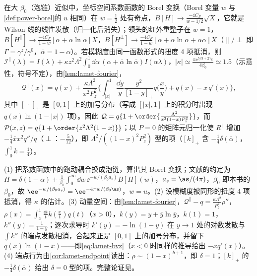 \begin{proposition}\label{prop:lamet-bvz}
在大 $\beta_0$（泡链）近似中，坐标空间系数函数的 Borel 变换（Borel 变量 $w$ 与\cref{def:power-borel}的 $u$ 相同）在 $w=\frac12$ 处有奇点，$B[H]\to\frac{-4C_F}{w-1/2}\sqrt X$，它就是 Wilson 线的线性发散（归一化后消失）；领头的红外重整子在 $w=1$，$B[H^\parallel]\to\frac{-4C_F}{1-w}[\alpha+\bar\alpha\ln\bar\alpha]X$，$B[H^\perp]\to\frac{-4C_F}{1-w}[\alpha+\bar\alpha\ln\bar\alpha+\alpha\bar\alpha]X$（$\parallel/\perp$ 即 $\Gamma=\gamma^z/\gamma^0$，$\bar\alpha=1-\alpha$）。若模糊度由同一函数形式的扭度 4 项抵消，则 $\mathcal I^\parallel(\lambda)=I(\lambda)+\kappa z^2\Lambda^2\int_0^1\dd\alpha\,(\alpha+\bar\alpha\ln\bar\alpha)I(\alpha\lambda)$，$|\kappa|\simeq\frac{\pi\ee^{5/3+2\gamma_E}}{4\beta_0}\simeq1.5$（示意性，符号不定），由\cref{lem:lamet-fourier}，
\begin{equation}\label{eq:lamet-bvz}
\mathcal Q^\parallel(x)=q(x)+\frac{\kappa\Lambda^2}{x^2P_z^2}\Big\{\int_{|x|}^1\frac{\dd y}y\frac{y^2}{[1-y]_+}q\Big(\frac xy\Big)+q(x)-x\,q'(x)\Big\},
\end{equation}%
其中 $[\,\cdot\,]_+$ 是 $[0,1]$ 上的加号分布（写成 $[|x|,1]$ 上的积分时出现 $q(x)\ln(1-|x|)$ 项）。因此 $\mathcal Q=q\{1+\order{\frac{\Lambda^2}{x^2(1-x)P_z^2}}\}$，而 $\mathcal P(x,z)=q\{1+\order{z^2\Lambda^2(1-x)}\}$；以 $P=0$ 的矩阵元归一化使 $R^\parallel$ 增加 $-\frac14\bar xx^2q''/q$（$\perp$：$-\frac5{12}$），即 $\Lambda^2/((1-x)^2P_z^2)$ 型的项（$[k]_+$ 含 $-\frac14\delta(\bar\alpha)$，$\int_0^1k=\frac14$）。
\end{proposition}

\begin{proofsketch}
(1) 把系数函数中的跑动耦合换成泡链，算出其 Borel 变换\cite{Braun:2018brg}；文献的约定为 $H=\delta(1-\alpha)+\frac1{\beta_0}\int_0^\infty\dd w\,\ee^{-w/(\beta_0a_s)}B[H](w)$，$a_s=\as/(4\pi)$，$\beta_0$ 即本书的 $\beta_0$，故 $\ee^{-w/(\beta_0a_s)}=\ee^{-4\pi w/(\beta_0\as)}$，$w=u$。(2) 设模糊度被同形的扭度 4 项抵消，得 $\kappa$ 的估计。(3) 动量空间：由\cref{lem:lamet-fourier}，$\mathcal Q^\parallel-q=\frac{\kappa\Lambda^2}{P_z^2}\rho''$，$\rho(x)=\int_x^1\frac{\dd t}tk(\frac xt)q(t)$（$x>0$），$k(y)=y+\bar y\ln\bar y$，$k(1)=1$，$k''(y)=\frac1{1-y}$；逐次求导时 $k'(y)=-\ln(1-y)$ 在 $y\to1$ 处的对数发散与 $\int k''$ 的端点发散相消，合起来正是 $[0,1]$ 上的加号分布，并留下 $q(x)\ln(1-x)$——即\cref{eq:lamet-bvz}（$x<0$ 时同样的推导给出 $-xq'(x)$）。(4) 端点行为由\cref{cor:lamet-endpoint}读出：$\rho\sim(1-x)^{b+1}$，即 $\delta=1$；$[k]_+$ 的 $-\frac14\delta(\bar\alpha)$ 给出 $\delta=0$ 型的项。完整论证见\cite{Braun:2018brg}。
\end{proofsketch}

